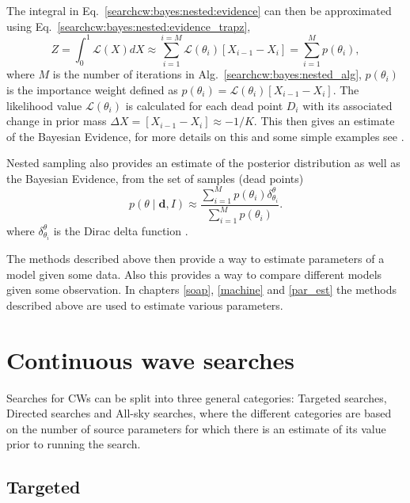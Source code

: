 The integral in Eq.~\ref{searchcw:bayes:nested:evidence} can then be approximated using Eq.~\ref{searchcw:bayes:nested:evidence_trapz},
\begin{equation}
\label{searchcw:bayes:nested:approx_evidence}
	Z = \int_0^1 \mathcal{L}(X) dX \approx \sum_{i=1}^{i=M}  \mathcal{L}(\theta_i)  \left[ X_{i-1} - X_{i} \right] = \sum_{i=1}^{M} p(\theta_i),
\end{equation}
where $M$ is the number of iterations in Alg.~\ref{searchcw:bayes:nested_alg}, $p(\theta_i)$ is the importance weight defined as $p(\theta_i) =  \mathcal{L}(\theta_i) \left[ X_{i-1} - X_{i} \right]$. The likelihood value $\mathcal{L}(\theta_i)$ is calculated for each dead point $D_i$ with its associated change in prior mass $\Delta X = \left[ X_{i-1} - X_{i} \right] \approx -1/K$. 
This then gives an estimate of the Bayesian Evidence, for more details on this and some simple examples see \citep{skilling2006NestedSampling,speagle2019DynestyDynamic,feroz2019ImportanceNested}.

Nested sampling also provides an estimate of the posterior distribution as well as the Bayesian Evidence, from the set of samples (dead points) 
\begin{equation}
	p(\theta \mid \bm{d}, I) \approx \frac{\sum_{i=1}^{M} p(\theta_i) \delta^{\theta}_{\theta_i}}{\sum_{i=1}^{M} p(\theta_i) }.
\end{equation}
where $\delta^{\theta}_{\theta_i}$ is the Dirac delta function \citep{speagle2019DynestyDynamic}.

The methods described above then provide a way to estimate parameters of a
model given some data.  Also this provides a way to compare different models
given some observation.  In chapters \ref{soap}, \ref{machine} and \ref{par_est} the methods
described above are used to estimate various parameters.

\section{\label{searchcw:search} Continuous wave searches}

Searches for \glspl{CW} can be split into three general categories: Targeted
searches, Directed searches and All-sky searches, where the different
categories are based on the number of source parameters for which there is an estimate of its value prior to running the search.

\subsection{\label{searchcw:search:targeted}Targeted}

